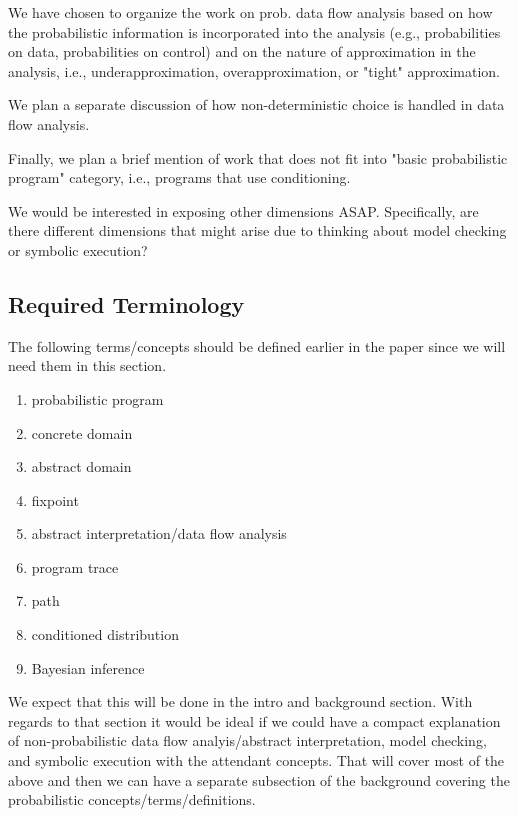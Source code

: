 We have chosen to organize the work on prob. data flow analysis based 
on how the probabilistic information is incorporated into the analysis
(e.g., probabilities on data, probabilities on control)
and on the nature of approximation in the analysis, 
i.e., underapproximation, overapproximation, or "tight" approximation.

We plan a separate discussion of how non-deterministic choice is
handled in data flow analysis.

Finally, we plan a brief mention of work that does not fit into 
"basic probabilistic program" category, i.e., programs that use
conditioning.

We would be interested in exposing other dimensions ASAP.  Specifically,
are there different dimensions that might arise due to thinking about 
model checking or symbolic execution?

\subsection{Required Terminology}

The following terms/concepts should be defined earlier in the paper
since we will need them in this section.

\begin{enumerate}

 \item probabilistic program
 \item concrete domain
 \item abstract domain
 \item fixpoint
 \item abstract interpretation/data flow analysis
 \item program trace
 \item path
 \item conditioned distribution
 \item Bayesian inference

\end{enumerate}

We expect that this will be done in the intro and background section.   With
regards to that section it would be ideal if we could have a compact
explanation of non-probabilistic data flow analyis/abstract interpretation,
model checking, and symbolic execution with the attendant concepts.
That will cover most of the above and then we can have a separate
subsection of the background covering the probabilistic 
concepts/terms/definitions.

